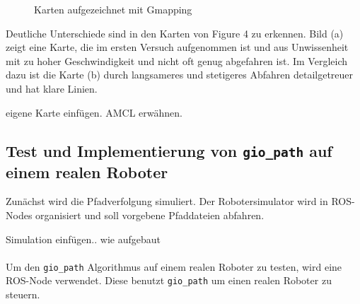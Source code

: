 \documentclass[11pt,a4paper]{article}
\begin{document}
{{	\begin{figure}[h]
		\centering
		\caption{Karten aufgezeichnet mit Gmapping}
	\end{figure}
	
	
	Deutliche Unterschiede sind in den Karten von Figure 4 zu erkennen. Bild (a) zeigt eine Karte, die im ersten Versuch aufgenommen ist und aus Unwissenheit mit zu hoher Geschwindigkeit und nicht oft genug abgefahren ist. Im Vergleich dazu ist die Karte (b) durch langsameres und stetigeres Abfahren detailgetreuer und hat klare Linien.
	
	
	eigene Karte einfügen. AMCL erwähnen.	
}




\subsection{Test und Implementierung von \texttt{gio\_path} auf einem realen Roboter}
Zun\"achst wird die Pfadverfolgung simuliert. Der Robotersimulator wird in ROS-Nodes organisiert und soll vorgebene Pfaddateien abfahren.

Simulation einfügen.. wie aufgebaut 
\\
\\
Um den \texttt{gio\_path} Algorithmus auf einem realen Roboter zu testen, wird eine ROS-Node verwendet. Diese benutzt  \texttt{gio\_path} um einen realen Roboter zu steuern.
\\


\begin{algorithm}
	

\end{algorithm}}
\end{document}
